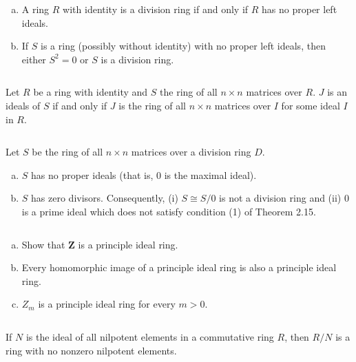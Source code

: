$$ $$

\begin{ex}
    \begin{enumerate}[(a)]
        \item A ring $R$ with identity is a division ring if and only if $R$ has no proper left ideals.
        \item If $S$ is a ring (possibly without identity) with no proper left ideals, then either $S^{2}=0$ or $S$ is a division ring.
    \end{enumerate}
\end{ex}

$$ $$

\begin{ex}
    Let $R$ be a ring with identity and $S$ the ring of all $n\times n$ matrices over $R$. $J$ is an ideals of $S$ if and only if $J$ is the ring of all $n\times n$ matrices over $I$ for some ideal $I$ in $R$.
\end{ex}

$$ $$

\begin{ex}
    Let $S$ be the ring of all $n\times n$ matrices over a division ring $D$.
    \begin{enumerate}[(a)]
        \item $S$ has no proper ideals (that is, 0 is the maximal ideal).
        \item $S$ has zero divisors. Consequently, (i) $S\cong S /0$ is not a division ring and (ii) 0 is a prime ideal which does not satisfy condition (1) of Theorem 2.15.
    \end{enumerate}
\end{ex}

$$ $$

\begin{ex}
    \begin{enumerate}[(a)]
        \item Show that $\mathbf{Z}$ is a principle ideal ring.
        \item Every homomorphic image of a principle ideal ring is also a principle ideal ring.
        \item $Z_{m}$ is a principle ideal ring for every $m>0$.
    \end{enumerate}
\end{ex}

$$ $$

\begin{ex}
    If $N$ is the ideal of all nilpotent elements in a commutative ring $R$, then $R /N$ is a ring with no nonzero nilpotent elements.
\end{ex}

